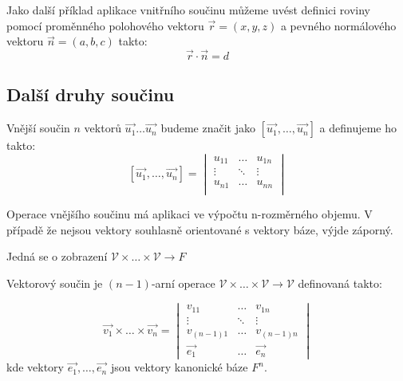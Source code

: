 Jako další příklad aplikace vnitřního součinu můžeme uvést definici roviny pomocí
proměnného polohového vektoru $\vec{r} = (x, y, z)$ a pevného normálového vektoru
$\vec{n} = (a, b, c)$ takto:
$$\vec{r} \cdot \vec{n} = d$$

\subsection{Další druhy součinu}
\begin{definition}
    Vnější součin $n$ vektorů $\vec{u_1} \ldots \vec{u_n}$ budeme značit jako
    $[\vec{u_1}, \ldots, \vec{u_n}]$ a definujeme ho takto:
    \[
        [\vec{u_1}, \ldots, \vec{u_n}] =
        \begin{vmatrix}
            u_{11} & \ldots & u_{1n}\\
            \vdots & \ddots & \vdots\\
            u_{n1} & \ldots & u_{nn}\\
        \end{vmatrix}
    \]

    Operace vnějšího součinu má aplikaci ve výpočtu n-rozměrného objemu. V případě
    že nejsou vektory souhlasně orientované s vektory báze, výjde záporný.

    Jedná se o zobrazení $\mathcal{V} \times \ldots \times \mathcal{V} \rightarrow F$
\end{definition}

\begin{definition}
    Vektorový součin je $(n-1)$-arní operace $\mathcal{V} \times \ldots \times \mathcal{V}
    \rightarrow \mathcal{V}$ definovaná takto:

    \[
      \vec{v_1} \times \ldots \times \vec{v_n} =
      \begin{vmatrix}
        v_{11} & \ldots & v_{1n} \\
        \vdots & \ddots & \vdots \\
        v_{(n-1)1} & \ldots & v_{(n-1)n} \\
        \vec{e_1} & \ldots & \vec{e_n}
      \end{vmatrix}
    \]
    kde vektory $\vec{e_1}, \ldots, \vec{e_n}$ jsou vektory kanonické báze $F^n$.
\end{definition}


